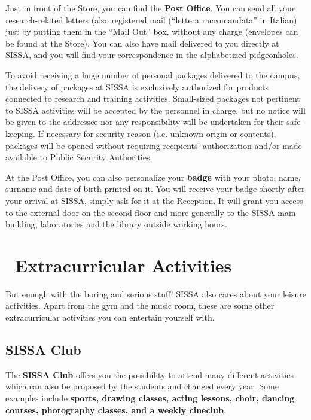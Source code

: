 \documentclass{sissavademecum}
\begin{document}
Just in front of the Store, you can find the \textbf{Post Office}. You can send all your research-related letters (also registered mail (``lettera raccomandata'' in Italian) just by putting them in the ``Mail Out'' box, without any charge (envelopes can be found at the Store). You can also have mail delivered to you directly at SISSA, and you will find your correspondence in the alphabetized pidgeonholes.

To avoid receiving a huge number of personal packages delivered to the campus, the delivery of packages at SISSA is exclusively authorized for products connected to research and training activities. Small-sized packages not pertinent to SISSA activities will be accepted by the personnel in charge, but no notice will be given to the addressee nor any responsibility will be undertaken for their safe-keeping. If necessary for security reason (i.e. unknown origin or contents), packages will be opened without requiring recipients' authorization and/or made available to Public Security Authorities.

At the Post Office, you can also personalize your \hypertarget{Badge}{}\textbf{badge} with your photo, name, surname and date of birth printed on it. You will receive your badge shortly after your arrival at SISSA, simply ask for it at the Reception. It will grant you access to the external door on the second floor and more generally to the SISSA main building, laboratories and the library outside working hours.


\chapter{\texorpdfstring{\faFutbol\ }{}Extracurricular Activities}

But enough with the boring and serious stuff! SISSA also cares about your leisure activities. Apart from the gym and the music room, these are some other extracurricular activities you can entertain yourself with.


\section{SISSA Club}

The \textbf{SISSA Club} offers you the possibility to attend many different activities which can also be proposed by the students and changed every year. Some examples include \textbf{sports, drawing classes, acting lessons, choir, dancing courses, photography classes, and a weekly cineclub}. 
\end{document}
